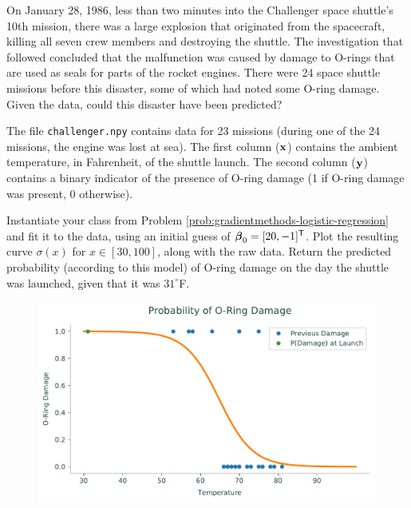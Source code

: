 \begin{problem}{}{}
On January 28, 1986, less than two minutes into the Challenger space shuttle's 10th mission, there was a large explosion that originated from the spacecraft, killing all seven crew members and destroying the shuttle.
The investigation that followed concluded that the malfunction was caused by damage to O-rings that are used as seals for parts of the rocket engines.
There were 24 space shuttle missions before this disaster, some of which had noted some O-ring damage.
Given the data, could this disaster have been predicted?

The file \texttt{challenger.npy} contains data for 23 missions (during one of the 24 missions, the engine was lost at sea).
The first column ($\mathbf{x}$) contains the ambient temperature, in Fahrenheit, of the shuttle launch.
The second column ($\mathbf{y}$) contains a binary indicator of the presence of O-ring damage (1 if O-ring damage was present, 0 otherwise).

Instantiate your class from Problem \ref{prob:gradientmethods-logistic-regression} and fit it to the data, using an initial guess of $\boldsymbol{\beta}_0 = [20, -1]^{\mathsf T}$.
Plot the resulting curve $\sigma(x)$ for $x \in [30, 100]$, along with the raw data.
Return the predicted probability (according to this model) of O-ring damage on the day the shuttle was launched, given that it was $31^\circ$F.

\begin{figure}[H]
\centering
    \includegraphics[width=.7\textwidth]{figures/logreg.pdf}
    \label{fig:logistic_curve}
\end{figure}
\end{problem}
